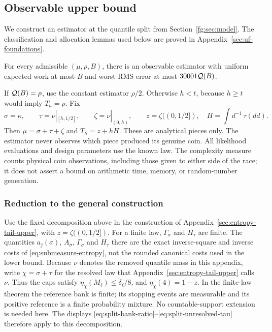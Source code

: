 \subsection{Observable upper bound}\label{fg:sec:direct-upper}
We construct an estimator at the quantile split from
Section~\ref{fg:sec:model}. The classification and allocation lemmas
used below are proved in Appendix~\ref{sec:uf-foundations}.

\begin{theorem}\label{fg:thm:direct-upper}
For every admissible $(\mu,\rho,B)$, there is an observable estimator
with uniform expected work at most $B$ and worst RMS error at most
$30001\mathcal Q(B)$.
\end{theorem}

If $\mathcal Q(B)=\rho$, use the constant estimator $\rho/2$.
Otherwise $h<t$, because $h\ge t$ would imply $T_h=\rho$.
Fix
\[
 \sigma=\kappa,\qquad \tau=\nu|_{[h,1/2]},\qquad
 \zeta=\nu|_{(0,h)},\qquad z=\zeta((0,1/2]),\quad
 H=\int d^{-1}\,\tau(dd).
\]
Then $\mu=\sigma+\tau+\zeta$ and $T_h=z+hH$.
These are analytical pieces only. The estimator never observes which
piece produced its genuine coin.
All likelihood evaluations and design parameters use the known law.
The complexity measure counts physical coin observations, including those
given to either side of the race; it does not assert a bound on arithmetic
time, memory, or random-number generation.

\subsubsection{Reduction to the general construction}
Use the fixed decomposition above in the construction of
Appendix~\ref{sec:entropy-tail-upper}, with $z=\zeta((0,1/2])$. For a
finite law, $\Gamma_\sigma$ and $H_\tau$ are finite. The quantities
$a_j(\sigma)$, $A_\sigma$, $\Gamma_\sigma$ and $H_\tau$ there are the
exact inverse-square and inverse costs of \eqref{eq:submeasure-entropy},
not the rounded canonical costs used in the lower bound. Because $\nu$
denotes the removed quantile mass in this appendix, write $\chi=\sigma+\tau$
for the resolved law that Appendix~\ref{sec:entropy-tail-upper} calls
$\nu$. Thus the caps satisfy $\eta_\chi(M_\ell)\le\delta_\ell/8$, and
$\eta_\chi(4)=1-z$. In the finite-law theorem the reference bank is
finite; its stopping events are measurable and its positive reference
is a finite probability mixture. No countable-support extension is
needed here. The displays
\eqref{eq:split-bank-ratio}--\eqref{eq:split-unresolved-tau} therefore
apply to this decomposition.

